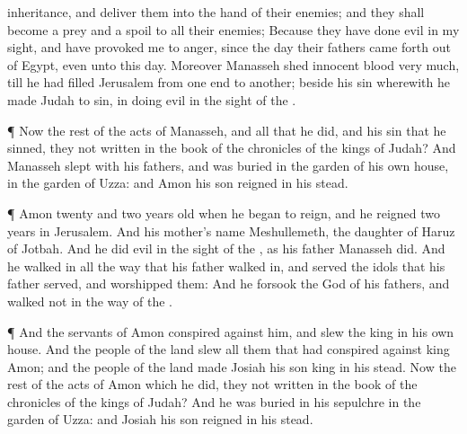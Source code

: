 {inheritance, and
deliver them into the
hand of their
enemies; and they shall become a
prey and a
spoil to all their
enemies;
Because they have
done
{}
evil in my
sight, and have
provoked me to
anger, since the
day their
fathers came
forth out of
Egypt, even unto this
day.
Moreover
Manasseh
shed
innocent
blood
very
much, till he had
filled
Jerusalem from one
end to
another; beside his
sin wherewith he made
Judah to
sin, in
doing
{}
evil in the
sight of the
{}.
\par }{\PP {}¶ Now the
rest of the
acts of
Manasseh, and all that he
did, and his
sin that he
sinned,
{} they not
written in the
book of the
chronicles of the
kings of
Judah?
And
Manasseh
slept with his
fathers, and was
buried in the
garden of his own
house, in the
garden of
Uzza: and
Amon his
son
reigned in his stead.
\par }{\PP {}¶
Amon
{}
twenty and
two
years
old when he began to
reign, and he
reigned
two
years in
Jerusalem. And his
mother’s
name
{}
Meshullemeth, the
daughter of
Haruz of
Jotbah.
And he
did
{}
evil in the
sight of the
{}, as his
father
Manasseh
did.
And he
walked in all the
way that his
father walked
in, and
served the
idols that his
father
served, and
worshipped them:
And he
forsook the
{}
God of his
fathers, and
walked not in the
way of the
{}.
\par }{\PP {}¶ And the
servants of
Amon
conspired against him, and
slew the
king in his own
house.
And the
people of the
land
slew all them that had
conspired against
king
Amon; and the
people of the
land made
Josiah his
son
king in his stead.
Now the
rest of the
acts of
Amon which he
did,
{} they not
written in the
book of the
chronicles of the
kings of
Judah?
And he was
buried in his
sepulchre in the
garden of
Uzza: and
Josiah his
son
reigned in his stead.

}
